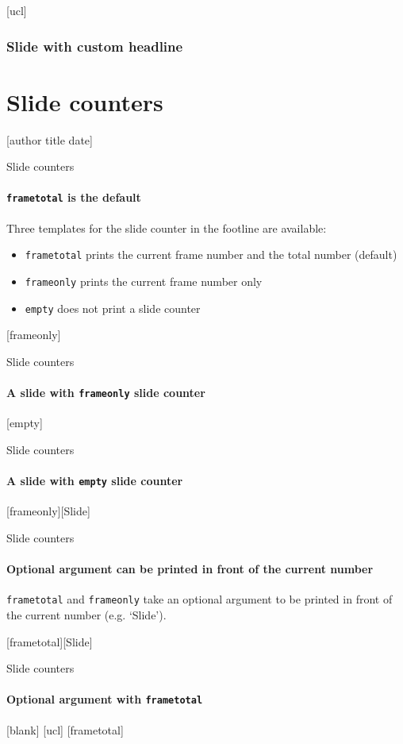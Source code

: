 \documentclass{beamer}
\begin{document}

[ucl]

\begin{frame}
  \frametitle{Slide with custom headline}
\end{frame}




\section{Slide counters}

[author title date]

\begin{frame}{Slide counters}
  \framesubtitle{\texttt{frametotal} is the default}
  Three templates for the slide counter in the footline are available:
  \begin{itemize}
    \item \texttt{frametotal} prints the current frame number and the total number (default)
    \item \texttt{frameonly} prints the current frame number only
    \item \texttt{empty} does not print a slide counter
  \end{itemize}
\end{frame}

[frameonly]
\begin{frame}{Slide counters}
  \framesubtitle{A slide with \texttt{frameonly} slide counter}
\end{frame}

[empty]
\begin{frame}{Slide counters}
  \framesubtitle{A slide with \texttt{empty} slide counter}
\end{frame}

[frameonly][Slide]
\begin{frame}{Slide counters}
  \framesubtitle{Optional argument can be printed in front of the current number}
  \texttt{frametotal} and \texttt{frameonly} take an optional argument
  to be printed in front of the current number (e.g. `Slide').
\end{frame}

[frametotal][Slide]
\begin{frame}{Slide counters}
  \framesubtitle{Optional argument with \texttt{frametotal}}
\end{frame}

[blank]
[ucl]
[frametotal]

\end{document}
